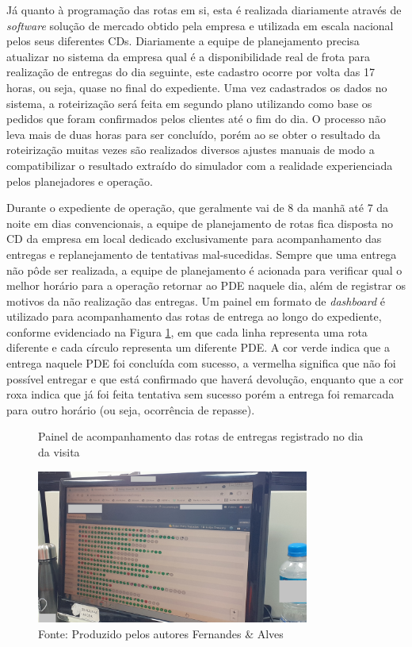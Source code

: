 Já quanto à programação das rotas em si, esta é realizada diariamente através de \textit{software} solução de mercado obtido pela empresa e utilizada em escala nacional pelos seus diferentes CDs.
Diariamente a equipe de planejamento precisa atualizar no sistema da empresa qual é a disponibilidade real de frota para realização de entregas do dia seguinte, este cadastro ocorre por volta das 17 horas, ou seja, quase no final do expediente.
Uma vez cadastrados os dados no sistema, a roteirização será feita em segundo plano utilizando como base os pedidos que foram confirmados pelos clientes até o fim do dia.
O processo não leva mais de duas horas para ser concluído, porém ao se obter o resultado da roteirização muitas vezes são realizados diversos ajustes manuais de modo a compatibilizar o resultado extraído do simulador com a realidade experienciada pelos planejadores e operação.

Durante o expediente de operação, que geralmente vai de 8 da manhã até 7 da noite em dias convencionais, a equipe de planejamento de rotas fica disposta no CD da empresa em local dedicado exclusivamente para acompanhamento das entregas e replanejamento de tentativas mal-sucedidas. 
Sempre que uma entrega não pôde ser realizada, a equipe de planejamento é acionada para verificar qual o melhor horário para a operação retornar ao PDE naquele dia, além de registrar os motivos da não realização das entregas.
Um painel em formato de \textit{dashboard} é utilizado para acompanhamento das rotas de entrega ao longo do expediente, conforme evidenciado na Figura \ref{fig:painel_repasses}, em que cada linha representa uma rota diferente e cada círculo representa um diferente PDE.
A cor verde indica que a entrega naquele PDE foi concluída com sucesso, a vermelha significa que não foi possível entregar e que está confirmado que haverá devolução, enquanto que a cor roxa indica que já foi feita tentativa sem sucesso porém a entrega foi remarcada para outro horário (ou seja, ocorrência de repasse).

\begin{figure}[htb]
    \centering
    \caption{Painel de acompanhamento das rotas de entregas registrado no dia da visita}
    \includegraphics[width=0.8\textwidth]{images/5_emp_bebidas/painel_rotas_CDD_diadema.jpg}
    \caption*{Fonte: Produzido pelos autores Fernandes \& Alves}
    \label{fig:painel_repasses}
\end{figure}

